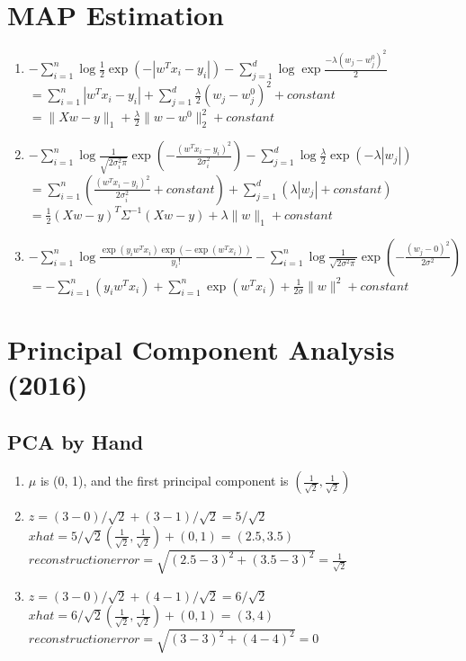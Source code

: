 \documentclass{article}
\def\norm#1{\|#1\|}
\def\enum#1{\begin{enumerate}#1\end{enumerate}}
\begin{document}
\section{MAP Estimation}

\enum{
\item $-\sum_{i=1}^n\log   \frac 1 2 \exp(-|w^Tx_i - y_i|)  -\sum_{j=1}^d\log \exp \frac{-\lambda(w_j -  w^0_j)^2}{2}$ \\
        $ =  \sum_{i=1}^n |w^Tx_i - y_i| +\sum_{j=1}^d  \frac{\lambda}{2}(w_j -  w^0_j)^2 + constant$\\
       $= \norm{Xw-y}_1 +  \frac{\lambda}{2} \norm{w -  w^0}^2_2 + constant$
\item  $-\sum_{i=1}^n\log  \frac{1}{\sqrt{2\sigma_i^2\pi}}\exp\left(-\frac{(w^Tx_i - y_i)^2}{2\sigma_i^2}\right) -\sum_{j=1}^d\log \frac{\lambda}{2}\exp(-\lambda|w_j|)  $\\
       $  =\sum_{i=1}^n( \frac{(w^Tx_i - y_i)^2}{2\sigma_i^2}+ constant) +  \sum_{j=1}^d (\lambda|w_j| +constant) $\\
       $ = \frac{1}{2}(Xw-y)^T \Sigma^{-1} (Xw-y) +\lambda\norm{w}_1+ constant $
\item  $-\sum_{i=1}^n\log  \frac{\exp(y_iw^Tx_i)\exp(-\exp(w^Tx_i))}{y_i!} -\sum_{i=1}^n \log  \frac{1}{\sqrt{2\sigma^2\pi}}\exp\left(-\frac{(w_j - 0)^2}{2\sigma^2}\right)$\\
        $= -\sum_{i=1}^n (y_iw^Tx_i) + \sum_{i=1}^n \exp(w^Tx_i) +\frac{1}{2\sigma}\norm{w}^2+ constant$
}


\section{Principal Component Analysis (2016)}

\subsection{PCA by Hand}

\enum{
\item $\mu$ is (0, 1), and the first principal component is $(\frac{1}{\sqrt2},\frac{1}{\sqrt2})$
\item $ z = (3-0)/ \sqrt2 +(3-1)/ \sqrt2 = 5/\sqrt2$ \\
        $ xhat = 5/\sqrt2 (\frac{1}{\sqrt2},\frac{1}{\sqrt2}) +(0,1) = (2.5,3.5)$\\
       $ reconstruction error = \sqrt{ (2.5-3)^2+(3.5-3)^2} = \frac{1}{\sqrt2} $
\item $ z = (3-0)/ \sqrt2 +(4-1)/ \sqrt2 = 6/\sqrt2$ \\
        $ xhat = 6/\sqrt2 (\frac{1}{\sqrt2},\frac{1}{\sqrt2}) +(0,1) = (3,4)$\\
       $ reconstruction error = \sqrt{ (3-3)^2+(4-4)^2} = 0 $
}
\end{document}
